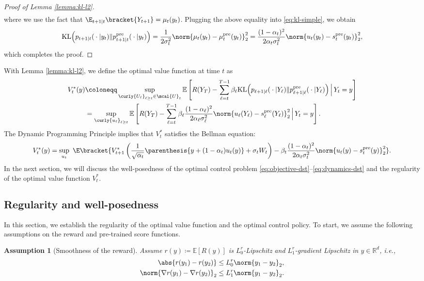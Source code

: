 \documentclass{article}
\newtheorem{Assumption}[Theorem]{Assumption}
\newcommand{\R}{\mathbb{R}}
\begin{document}
\begin{proof}[Proof of Lemma \ref{lemma:kl-l2}]
\begin{align*}
        \end{align*}
        where we use the fact that $\E_{t+1\vert t}\bracket{Y_{t+1}} = \mu_t(y_t)$.
        Plugging the above equality into \eqref{eq:kl-simple}, we obtain
        \begin{align*}
            {\rm KL}\Big(p_{t+1\vert t}({}\cdot{}\vert y_t) \|p_{t+1\vert t}^{\rm pre}({}\cdot{}\vert y_t)\Big) = \frac{1}{2\sigma_t^2}\norm{\mu_t(y_t) - \mu_t^{\rm pre}(y_t)}_2^2 =  \frac{(1 - \alpha_{t})^{2}}{2\alpha_{t}\sigma_{t}^{2}}\norm{u_{t}(y_t) - s^{\rm pre}_{t}(y_{t})}_{2}^{2},
        \end{align*}
        which completes the proof. 
    \end{proof}

    
    With Lemma \ref{lemma:kl-l2}, we define the optimal value function at time $ t $ as
    \begin{align}
    V^{*}_{t}(y) &\coloneqq \sup_{\curly{U_{\ell}}_{\ell \geq t}\in \mcal{U}_t}\mathbb{E}\left[R(Y_T) - \sum_{\ell = t}^{T-1}\beta_\ell{\rm KL}\Big(p_{\ell+1\vert \ell}({}\cdot{}\vert Y_\ell) \|p_{\ell+1\vert \ell}^{\rm pre}({}\cdot{}\vert Y_\ell)\Big)\,\Big\vert \,Y_t=y\right] \nonumber \\
    &=\sup_{\curly{u_{\ell}}_{\ell \geq t}}\mathbb{E}\left[R(Y_T) - \sum_{\ell = t}^{T-1}\beta_\ell\frac{(1 - \alpha_{\ell})^{2}}{2\alpha_{\ell}\sigma_{\ell}^{2}}\norm{u_{\ell}(Y_\ell) - s^{\rm pre}_{\ell}(Y_{\ell})}_{2}^{2}\,\Big\vert \,Y_t=y\right]. \label{eq:opt-value}
    \end{align}
The Dynamic Programming Principle implies that $V_t^*$ satisfies the Bellman equation:
    \begin{align}
        V^{*}_{t}(y) =\sup_{u_{t}} \ \E\bracket{V^{*}_{t+1}\left(\frac{1}{\sqrt{\alpha_t}}\parenthesis{y + (1 - \alpha_t)u_t(y)} + \sigma_t W_t\right) - \beta_t \frac{(1 - \alpha_{t})^{2}}{2\alpha_{t}\sigma_{t}^{2}}\norm{u_{t}(y) - s^{\rm pre}_{t}(y)}_{2}^{2}}.\label{eq:bellman-V*}
    \end{align} 
In the next section, we will discuss the well-posedness of the optimal control problem \eqref{eq:objective-dst}--\eqref{eq:dynamics-dst} and the regularity of the optimal value function $V_t^*$. 
    
\subsection{Regularity and well-posedness}
In this section, we establish the regularity of the optimal value function and the optimal control policy. To start, we assume the following assumptions on the reward and pre-trained score functions.
\begin{Assumption}[Smoothness of the reward]\label{ass:smooth r}
    Assume $r(y) \coloneqq \mathbb{E}[R(y)]$ is $L_{0}^r$-Lipschitz and $L_{1}^r$-gradient Lipschitz in $y \in \R^d$, i.e.,
    \begin{align}
        \abs{r(y_1) - r(y_2) } \leq L_{0}^r\norm{y_1 - y_2}_2, \\ 
        \norm{\nabla r(y_1) - \nabla r(y_2) }_2 \leq L_{1}^r\norm{y_1 - y_2}_2.
    \end{align}
\end{Assumption}
\end{document}
